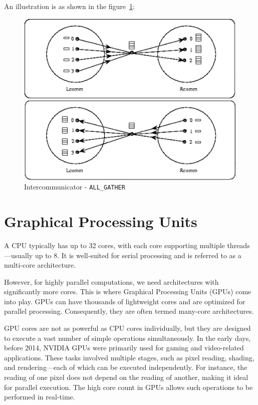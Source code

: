 \documentclass[12pt]{book}
\begin{document}
An illustration is as shown in the figure~\ref{fig:allgatherinter}:
\begin{figure}
    \centering
    \includegraphics[width=0.5\linewidth]{images/extend_collect.png}
    \caption{Intercommunicator - \texttt{ALL\_GATHER}}
    \label{fig:allgatherinter}
\end{figure}





















\chapter{Graphical Processing Units}

A CPU typically has up to 32 cores, with each core supporting multiple threads—usually up to 8. It is well-suited for serial processing and is referred to as a multi-core architecture.

However, for highly parallel computations, we need architectures with significantly more cores. This is where Graphical Processing Units (GPUs) come into play. GPUs can have thousands of lightweight cores and are optimized for parallel processing. Consequently, they are often termed many-core architectures.

GPU cores are not as powerful as CPU cores individually, but they are designed to execute a vast number of simple operations simultaneously. In the early days, before 2014, NVIDIA GPUs were primarily used for gaming and video-related applications. These tasks involved multiple stages, such as pixel reading, shading, and rendering—each of which can be executed independently. For instance, the reading of one pixel does not depend on the reading of another, making it ideal for parallel execution. The high core count in GPUs allows such operations to be performed in real-time.
\end{document}
